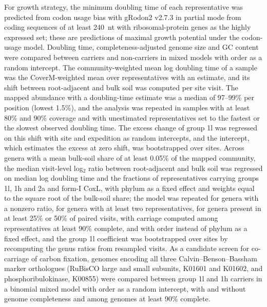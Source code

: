 For growth strategy, the minimum doubling time of each representative was predicted from codon usage bias
with gRodon2 v2.7.3 \citep{weissman2021grodon} in partial mode from coding sequences of at least 240~nt
with ribosomal-protein genes as the highly expressed set; these are predictions of maximal growth
potential under the codon-usage model. Doubling time, completeness-adjusted genome size and GC content were
compared between carriers and non-carriers in mixed models with order as a random intercept. The
community-weighted mean log doubling time of a sample was the CoverM-weighted mean over representatives
with an estimate, and its shift between root-adjacent and bulk soil was computed per site visit. The
mapped abundance with a doubling-time estimate was a median of 97--99\% per position (lowest 1.5\%), and the
analysis was repeated in samples with at least 80\% and 90\% coverage and with unestimated representatives
set to the fastest or the slowest observed doubling time. The
excess change of group 1l was regressed on this shift with site and expedition as random intercepts, and
the intercept, which estimates the excess at zero shift, was bootstrapped over sites. Across genera with a
mean bulk-soil share of at least 0.05\% of the mapped community, the median visit-level log$_2$ ratio
between root-adjacent and bulk soil was regressed on median log doubling time and the fractions of
representatives carrying groups 1l, 1h and 2a and form-I CoxL, with phylum as a fixed effect and weights
equal to the square root of the bulk-soil share; the model was repeated for genera with a nonzero ratio,
for genera with at least two representatives, for genera present in at least 25\% or 50\% of paired visits,
with carriage computed among representatives at least 90\% complete, and with order instead of phylum as a
fixed effect, and the group 1l coefficient was bootstrapped over sites by recomputing the genus ratios from
resampled visits. As a candidate screen for co-carriage of carbon fixation, genomes encoding all three
Calvin--Benson--Bassham marker orthologues (RuBisCO large and small subunits, K01601 and K01602, and
phosphoribulokinase, K00855) were compared between group 1l and 1h carriers in a binomial mixed model with
order as a random intercept, with and without genome completeness and among genomes at least 90\% complete.


